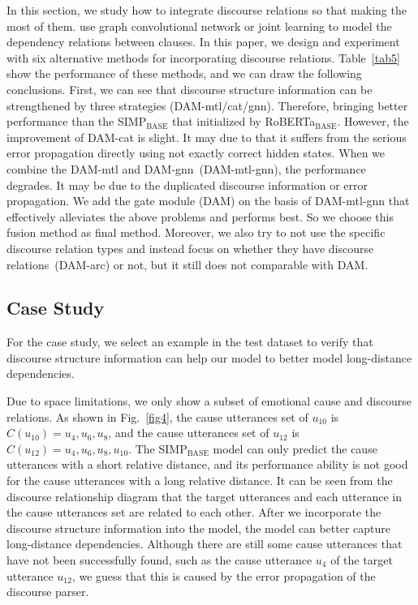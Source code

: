\documentclass[11pt]{article}
\begin{document}
In this section, we study how to integrate discourse relations so that making the most of them.
\citet{chen2020end,ding2020ecpe} use graph convolutional network or joint learning to model the dependency relations between clauses.
In this paper, we design and experiment with six alternative methods for incorporating discourse relations.
Table~\ref{tab5} show the performance of these methods, and we can draw the following conclusions.
First, we can see that discourse structure information can be strengthened by three strategies (DAM-mtl/cat/gnn).
Therefore, bringing better performance than the SIMP$_{\textrm{BASE}}$ that initialized by RoBERTa$_{\textrm{BASE}}$.
However, the improvement of DAM-cat is slight.
It may due to that it suffers from the serious error propagation directly using not exactly correct hidden states.
When we combine the DAM-mtl and DAM-gnn~(DAM-mtl-gnn), the performance degrades.
It may be due to the duplicated discourse information or error propagation.
We add the gate module (DAM) on the basis of DAM-mtl-gnn that  effectively alleviates the above problems and performs best.
So we choose this fusion method as final method.
Moreover, we also try to not use the specific discourse relation types and instead focus on whether they have discourse relations~(DAM-arc) or not, but it still does not comparable with DAM.

\subsection{Case Study}

For the case study, we select an example in the test dataset to verify that discourse structure information can help our model to better model long-distance dependencies.

Due to space limitations, we only show a subset of emotional cause and discourse relations.
As shown in Fig.~\ref{fig4}, the cause utterances set of $u_{10}$ is $C(u_{10}) = {u_4, u_6, u_8}$, and the cause utterances set of $u_{12}$ is $C(u_{12}) = {u_4, u_6, u_8, u_{10}}$.
The SIMP$_{\textrm{BASE}}$ model can only predict the cause utterances with a short relative distance, and its performance ability is not good for the cause utterances with a long relative distance.
It can be seen from the discourse relationship diagram that the target utterances and each utterance in the cause utterances set are related to each other.
After we incorporate the discourse structure information into the model, the model can better capture long-distance dependencies.
Although there are still some cause utterances that have not been successfully found, such as the cause utterance $u_4$ of the target utterance $u_{12}$, we guess that this is caused by the error propagation of the discourse parser.
\end{document}
